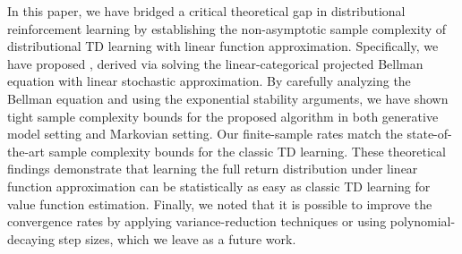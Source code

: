 In this paper, we have bridged a critical theoretical gap in distributional reinforcement learning by establishing the non-asymptotic sample complexity of distributional TD learning with linear function approximation. 
Specifically, we have proposed {\LCTD}, derived via solving the linear-categorical projected Bellman equation with linear stochastic approximation.
By carefully analyzing the Bellman equation and using the exponential stability arguments, we have shown tight sample complexity bounds for the proposed algorithm in both generative model setting and Markovian setting. 
Our finite-sample rates match the state-of-the-art sample complexity bounds for the classic TD learning.
These theoretical findings demonstrate that learning the full return distribution under linear function approximation can be statistically as easy as classic TD learning for value function estimation.
Finally, we noted that it is possible to improve the convergence rates by applying variance-reduction techniques or using polynomial-decaying step sizes, which we leave as a future work.